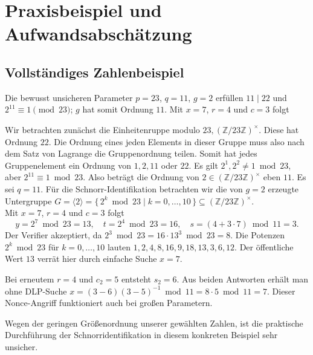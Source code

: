 \section{Praxisbeispiel und Aufwandsabschätzung}\label{sec:praxis}
\subsection{Vollständiges Zahlenbeispiel}
Die bewusst unsicheren Parameter $p=23$, $q=11$, $g=2$ erfüllen $11\mid22$ und $2^{11}\equiv1\pmod{23}$; $g$ hat somit Ordnung $11$. 
Mit $x=7$, $r=4$ und $c=3$ folgt

Wir betrachten zunächst die Einheitenruppe modulo $23, (\mathbb Z /23 \mathbb Z)^\times$. Diese hat Ordnung $22$. 
Die Ordnung eines jeden Elements in dieser Gruppe muss also nach dem Satz von Lagrange die Gruppenordnung teilen.
Somit hat jedes Gruppenelement ein Ordnung von $1,2,11$ oder $22$. Es gilt $2^1, 2^2 \neq 1 \bmod 23$, aber $2^{11} \equiv 1 \bmod 23$.
Also beträgt die Ordnung von $2 \in (\mathbb Z /23 \mathbb Z)^\times$ eben $11$. Es sei $q = 11$. 
Für die Schnorr-Identifikation betrachten wir die von \(g=2\) erzeugte
Untergruppe
$
    G = \langle 2 \rangle
      = \{\,2^k \bmod 23 \mid k=0,\ldots,10\,\}
      \subseteq (\mathbb{Z}/23\mathbb{Z})^\times.
$ \\
Mit $x=7$, $r=4$ und $c=3$ folgt
\[
 y=2^7\bmod23=13,\quad t=2^4\bmod23=16,\quad
 s=(4+3\cdot7)\bmod11=3.
\]
Der Verifier akzeptiert, da $2^3\bmod23=16\cdot13^3\bmod23=8$. Die Potenzen $2^k\bmod23$ für $k=0,\ldots,10$ lauten $1,2,4,8,16,9,18,13,3,6,12$. Der öffentliche Wert $13$ verrät hier durch einfache Suche $x=7$.

Bei erneutem $r=4$ und $c_2=5$ entsteht $s_2=6$. Aus beiden Antworten erhält man ohne DLP-Suche $x=(3-6)(3-5)^{-1}\bmod11=8\cdot5\bmod11=7$. Dieser Nonce-Angriff funktioniert auch bei großen Parametern.

Wegen der geringen Größenordnung unserer gewählten Zahlen, ist die praktische Durchführung der Schnorridentifikation in diesem konkreten Beispiel sehr unsicher.

